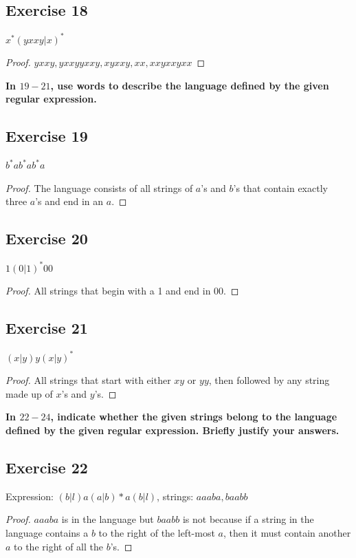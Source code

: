 \documentclass[14pt]{extarticle}
\newcommand{\cy}{\color{cyan}}
\begin{document}
\subsection{Exercise 18}
\(x^*(yxxy | x)^*\)

\begin{proof}
    \(yxxy, yxxyyxxy, xyxxy, xx, xxyxxyxx\)
\end{proof}

{\bf In \(19-21\), use words to describe the language defined by the given regular expression.}

\subsection{Exercise 19}
\(b^*ab^*ab^*a\)

\begin{proof}
    The language consists of all strings of \(a\)’s and \(b\)’s that contain exactly three \(a\)’s and end in an \(a\).
\end{proof}

\subsection{Exercise 20}
\(1(0 | 1)^* 00\)

\begin{proof}
    All strings that begin with a 1 and end in 00.
\end{proof}

\subsection{Exercise 21}
\((x | y)y(x | y)^*\)

\begin{proof}
    All strings that start with either \(xy\) or \(yy\), then followed by any string made up of \(x\)'s and \(y\)'s.
\end{proof}

{\bf \cy In \(22-24\), indicate whether the given strings belong to the language defined by the given regular
expression. Briefly justify your answers.}

\subsection{Exercise 22}
Expression: \((b | l)a(a | b)* a(b | l)\), strings: \(aaaba, baabb\)

\begin{proof}
    \(aaaba\) is in the language but \(baabb\) is not because if a string in the language contains a \(b\) to the right of the
    left-most \(a\), then it must contain another \(a\) to the right of all the \(b\)’s.
\end{proof}
\end{document}
